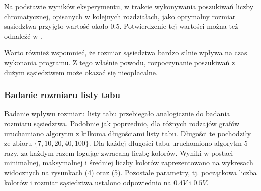 \documentclass[12pt,a4paper]{article}
\begin{document}
Na podstawie wyników eksperymentu, w trakcie wykonywania poszukiwań liczby chromatycznej, opisanych w kolejnych rozdziałach, jako optymalny rozmiar sąsiedztwa przyjęto wartość około $0.5$. Potwierdzenie tej wartości można też odnaleźć w \cite{Hertz1987}.

Warto również wspomnieć, że rozmiar sąsiedztwa bardzo silnie wpływa na czas wykonania programu. Z tego właśnie powodu, rozpoczynanie poszukiwań z dużym sąsiedztwem może okazać się nieopłacalne.

\subsubsection{Badanie rozmiaru listy tabu}
Badanie wpływu rozmiaru listy tabu przebiegało analogicznie do badania rozmiaru sąsiedztwa. Podobnie jak poprzednio, dla różnych rodzajów grafów uruchamiano algorytm z kilkoma długościami listy tabu. Długości te pochodziły ze zbioru $\lbrace7,10,20,40,100\rbrace$. Dla każdej długości tabu uruchomiono algorytm 5 razy, za każdym razem logując zwracaną liczbę kolorów. Wyniki w postaci minimalnej, maksymalnej i średniej liczby kolorów zaprezentowano na wykresach widocznych na rysunkach (4) oraz (5). Pozostałe parametry, tj. początkowa liczba kolorów i rozmiar sąsiedztwa ustalono odpowiednio na $0.4V$ i $0.5V$.
\end{document}
